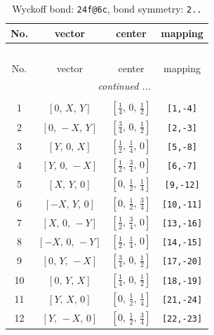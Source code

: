 \documentclass[fleqn,8pt]{jsarticle}
\begin{document}
\begin{longtable}{cccc}
\caption{Wyckoff bond: {\tt 24f@6c}, bond symmetry: {\tt 2..}}
 \\
 \hline \hline
No. & vector & center & mapping \\ \hline \endfirsthead

\multicolumn{3}{l}{\tablename\ \thetable{}} \\
 \hline \hline
No. & vector & center & mapping \\ \hline \endhead

 \hline \hline
\multicolumn{3}{r}{\footnotesize\it continued ...} \\ \endfoot

 \hline \hline
\multicolumn{3}{r}{} \\ \endlastfoot

1 & $\left[ 0,\, X,\, Y \right]$ & $\left[ \frac{1}{4},\, 0,\, \frac{1}{2} \right]$ & {\tt [1,-4]} \\ \hline
2 & $\left[ 0,\, - X,\, Y \right]$ & $\left[ \frac{3}{4},\, 0,\, \frac{1}{2} \right]$ & {\tt [2,-3]} \\ \hline
3 & $\left[ Y,\, 0,\, X \right]$ & $\left[ \frac{1}{2},\, \frac{1}{4},\, 0 \right]$ & {\tt [5,-8]} \\ \hline
4 & $\left[ Y,\, 0,\, - X \right]$ & $\left[ \frac{1}{2},\, \frac{3}{4},\, 0 \right]$ & {\tt [6,-7]} \\ \hline
5 & $\left[ X,\, Y,\, 0 \right]$ & $\left[ 0,\, \frac{1}{2},\, \frac{1}{4} \right]$ & {\tt [9,-12]} \\ \hline
6 & $\left[ - X,\, Y,\, 0 \right]$ & $\left[ 0,\, \frac{1}{2},\, \frac{3}{4} \right]$ & {\tt [10,-11]} \\ \hline
7 & $\left[ X,\, 0,\, - Y \right]$ & $\left[ \frac{1}{2},\, \frac{3}{4},\, 0 \right]$ & {\tt [13,-16]} \\ \hline
8 & $\left[ - X,\, 0,\, - Y \right]$ & $\left[ \frac{1}{2},\, \frac{1}{4},\, 0 \right]$ & {\tt [14,-15]} \\ \hline
9 & $\left[ 0,\, Y,\, - X \right]$ & $\left[ \frac{3}{4},\, 0,\, \frac{1}{2} \right]$ & {\tt [17,-20]} \\ \hline
10 & $\left[ 0,\, Y,\, X \right]$ & $\left[ \frac{1}{4},\, 0,\, \frac{1}{2} \right]$ & {\tt [18,-19]} \\ \hline
11 & $\left[ Y,\, X,\, 0 \right]$ & $\left[ 0,\, \frac{1}{2},\, \frac{1}{4} \right]$ & {\tt [21,-24]} \\ \hline
12 & $\left[ Y,\, - X,\, 0 \right]$ & $\left[ 0,\, \frac{1}{2},\, \frac{3}{4} \right]$ & {\tt [22,-23]} \\ \hline

\end{longtable}
\end{document}
